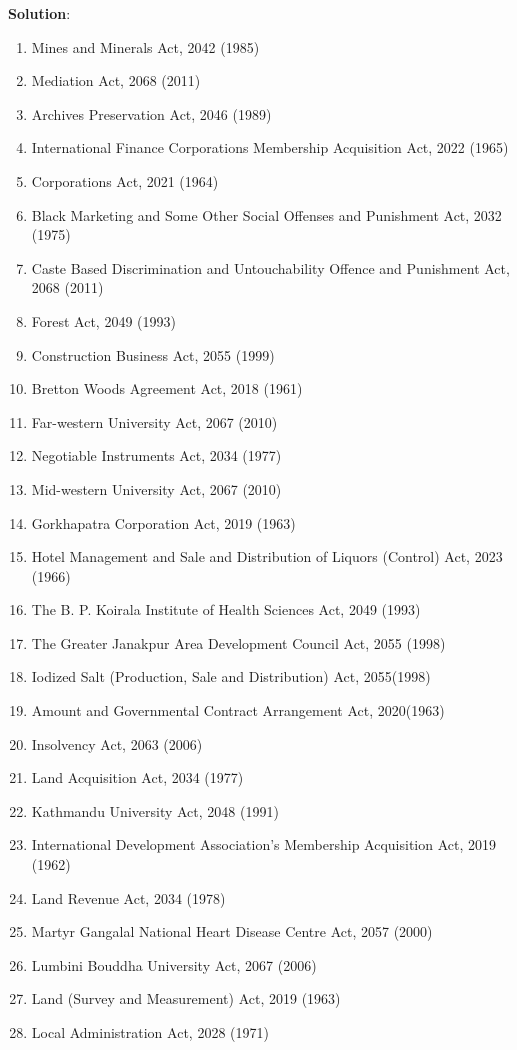 \documentclass[
  openany]{book}
\newenvironment{solution}{ {\bfseries Solution}:}{}
\begin{document}
\begin{questions}
\begin{solution}
\begin{enumerate}
\item Mines and Minerals Act, 2042 (1985)
\item Mediation Act, 2068 (2011)
\item Archives Preservation Act, 2046 (1989)
\item International Finance Corporations Membership Acquisition Act, 2022 (1965)
\item Corporations Act, 2021 (1964)
\item Black Marketing and Some Other Social Offenses and Punishment Act, 2032 (1975)
\item Caste Based Discrimination and Untouchability Offence and Punishment Act, 2068 (2011)
\item Forest Act, 2049 (1993)
\item Construction Business Act, 2055 (1999)
\item Bretton Woods Agreement Act, 2018 (1961)
\item Far-western University Act, 2067 (2010)
\item Negotiable Instruments Act, 2034 (1977)
\item Mid-western University Act, 2067 (2010)
\item Gorkhapatra Corporation Act, 2019 (1963)
\item Hotel Management and Sale and Distribution of Liquors (Control) Act, 2023 (1966)
\item The B. P. Koirala Institute of Health Sciences Act, 2049 (1993)
\item The Greater Janakpur Area Development Council Act, 2055 (1998)
\item Iodized Salt (Production, Sale and Distribution) Act, 2055(1998)
\item Amount and Governmental Contract Arrangement Act, 2020(1963)
\item Insolvency Act, 2063 (2006)
\item Land Acquisition Act, 2034 (1977)
\item Kathmandu University Act, 2048 (1991)
\item International Development Association’s Membership Acquisition Act, 2019 (1962)
\item Land Revenue Act, 2034 (1978)
\item Martyr Gangalal National Heart Disease Centre Act, 2057 (2000)
\item Lumbini Bouddha University Act, 2067 (2006)
\item Land (Survey and Measurement) Act, 2019 (1963)
\item Local Administration Act, 2028 (1971)

\end{enumerate}
\end{solution}
\end{questions}
\end{document}
